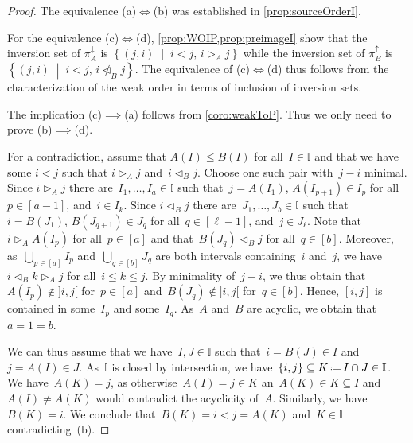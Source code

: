 \documentclass[reqno]{amsart}
\theoremstyle{definition}
\newcommand{\set}[2]{\left\{ #1 \;\middle|\; #2 \right\}} %
\newcommand{\eqdef}{\mbox{\,\raisebox{0.2ex}{\scriptsize\ensuremath{\mathrm:}}\ensuremath{=}\,}} %
\newcommand{\less}{\vartriangleleft} %
\newcommand{\more}{\vartriangleright} %
\newcommand{\projDown}{\pi^\downarrow} %
\newcommand{\projUp}{\pi^\uparrow} %
\newcommand{\II}{\mathbb I} %
\begin{document}
\begin{proof}
The equivalence \mbox{(a)$\iff$(b)} was established in \cref{prop:sourceOrderI}.

For the equivalence \mbox{(c)$\iff$(d)}, \cref{prop:WOIP,prop:preimageI} show that the inversion set of $\projDown_A$ is $\set{(j,i)}{i<j, \, i \more_A j}$ 
while the inversion set of $\projUp_B$ is~$\set{(j,i)}{i<j, \, i \not\less_B j}$.
The equivalence of \mbox{(c)$\iff$(d)} thus follows from the characterization of the weak order in terms of inclusion of inversion sets.

The implication \mbox{(c)$\implies$(a)} follows from  \cref{coro:weakToP}.
Thus we only need to prove \mbox{(b)$\implies$(d)}.

For a contradiction, assume that $A(I) \le B(I)$ for all~$I \in \II$ and that we have some $i<j$ such that $i \more_A j$ and~$i \less_B j$.
Choose one such pair with~$j-i$ minimal.
Since $i \more_A j$ there are~$I_1, \dots, I_a \in \II$ such that~$j = A(I_1)$, $A(I_{p+1}) \in I_p$ for all~$p \in [a-1]$, and~$i \in I_k$.
Since $i \less_B j$ there are~$J_1, \dots, J_b \in \II$ such that~$i = B(J_1)$, $B(J_{q+1}) \in J_q$ for all~$q \in [\ell-1]$, and~$j \in J_\ell$.
Note that~$i \more_A A(I_p)$ for all~$p \in [a]$ and that~$B(J_q) \less_B j$ for all~$q \in [b]$.
Moreover, as~$\bigcup_{p \in [a]} I_p$ and~$\bigcup_{q \in [b]} J_q$ are both intervals containing~$i$ and~$j$, we have~$i \less_B k \more_A j$ for all~$i \le k \le j$.
By minimality of~$j-i$, we thus obtain that~$A(I_p) \notin {]i,j[}$ for~$p \in [a]$ and~$B(J_q) \notin {]i,j[}$ for~$q \in [b]$.
Hence, $[i,j]$ is contained in some~$I_p$ and some~$I_q$.
As~$A$ and~$B$ are acyclic, we obtain that~$a = 1 = b$.

We can thus assume that we have~$I,J \in \II$ such that~$i = B(J) \in I$ and~$j = A(I) \in J$.
As~$\II$ is closed by intersection, we have~$\{i,j\} \subseteq K \eqdef I \cap J \in \II$.
We have~$A(K) = j$, as otherwise~${A(I) = j \in K}$ an~$A(K) \in K \subseteq I$ and~$A(I) \ne A(K)$ would contradict the acyclicity of~$A$.
Similarly, we have~$B(K) = i$.
We conclude that~$B(K) = i < j = A(K)$ and~$K \in \II$ contradicting~(b).
\end{proof}
\end{document}

